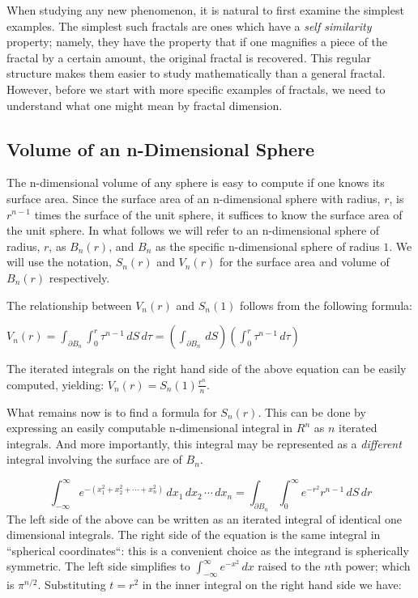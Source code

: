{When studying any new phenomenon, it is natural to first examine the
simplest examples. The simplest such fractals are ones which have a
{\it self similarity} property; namely, they have the property that if
one magnifies a piece of the fractal by a certain amount, the original
fractal is recovered. This regular structure makes them easier to
study mathematically than a general fractal. However, before we start
with more specific examples of fractals, we need to understand what 
one might mean by fractal dimension.

\subsection{Volume of an n-Dimensional Sphere}
The n-dimensional volume of any sphere is easy to compute if one 
knows its surface area. Since the surface area of an n-dimensional sphere 
with radius, $r$, is $r^{n-1}$ times the surface of the unit sphere, 
it suffices to know the surface area of the unit sphere.
In what follows we will refer to an n-dimensional sphere of radius, $r$, 
as $B_n(r)$, and $B_n$ as the specific n-dimensional sphere of radius $1$.
We will use the notation, $S_n(r)$ and $V_n(r)$ for the surface area and volume 
of $B_n(r)$ respectively.

The relationship between $V_n(r)$ and $S_n(1)$ 
follows from the following formula:%

${V}_n(r) =  \int_{\partial B_n} \int_0^r \tau^{n-1} \,dS \,d\tau = \left(\int_{\partial B_n} \, dS\right) \left( \int_0^r \tau^{n-1} \, d\tau \right)$

The iterated integrals on the right hand side of the above equation can 
be easily computed, yielding: ${V}_n(r) = {S}_n(1) \frac{r^n}{n}$.

What remains now is to find a formula for $S_n(r).$
This can be done by expressing an easily computable 
n-dimensional integral in $R^n$ as $n$ iterated integrals. 
And more importantly, this integral may be represented as a {\it different\/} 
integral involving the surface are of $B_n$.

$$
\int_{-\infty}^{\infty} e^{-(x_1^2 + x_2^2 + \cdots + x_n^2)} \, dx_1\, dx_2
\, \cdots \, dx_n = \int_{\partial B_n} \int_0^\infty e^{-r^2} r^{n-1} \,
dS\, dr
$$
The left side of the above can be written as an iterated integral of identical 
one dimensional integrals. The right side of the equation is the same 
integral in ``spherical coordinates``: this is a convenient choice as 
the integrand is spherically symmetric. The left side simplifies to 
$\int_{-\infty}^{\infty} e^{-x^2} \, dx$ raised to the $n$th power;
which is $\pi^{n/2}$. Substituting $t = r^2$ in the inner integral on
the right hand side we have:

}
